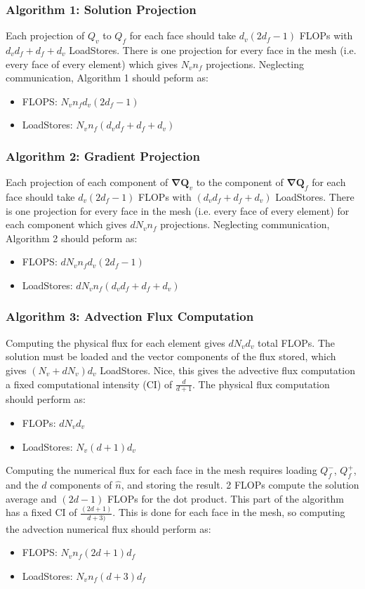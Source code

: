 \documentclass[11pt]{article}
\renewcommand{\vec}[1]{\bm{#1}}
\begin{document}
\subsubsection{Algorithm 1: Solution Projection}
Each projection of $Q_v$ to $Q_f$ for each face should take $d_v(2d_f - 1)$ FLOPs with $d_v d_f + d_f + d_v$ LoadStores.  There is one projection for every face in the mesh (i.e. every face of every element) which gives $N_v n_f$ projections. Neglecting communication, Algorithm 1 should peform as:
\begin{itemize}
\item FLOPS: $N_v n_f d_v(2d_f - 1)$
\item LoadStores: $N_v n_f (d_v d_f + d_f + d_v)$
\end{itemize}
\subsubsection{Algorithm 2: Gradient Projection}
Each projection of each component of $\vec{\nabla{Q}}_v$ to the component of $\vec{\nabla{Q}}_f$ for each face should take $d_v (2d_f - 1)$ FLOPs with $(d_v d_f + d_f + d_v)$ LoadStores.  There is one projection for every face in the mesh (i.e. every face of every element) for each component which gives $d N_v n_f$ projections. Neglecting communication, Algorithm 2 should peform as:
\begin{itemize}
\item FLOPS: $d N_v n_f d_v(2d_f - 1)$
\item LoadStores: $d N_v n_f (d_v d_f + d_f + d_v)$
\end{itemize}
\subsubsection{Algorithm 3: Advection Flux Computation}
Computing the physical flux for each element gives $d N_v d_v$ total FLOPs. The solution must be loaded and the vector components of the flux stored, which gives $(N_v + d N_v)d_v$ LoadStores. Nice, this gives the advective flux computation a fixed computational intensity (CI) of $\frac{d}{d+1}$.  The physical flux computation should perform as:

\begin{itemize}
\item FLOPs: $d N_v d_v$
\item LoadStores: $N_v(d+1)d_v$ 
\end{itemize}

Computing the numerical flux for each face in the mesh requires loading $Q^-_f$, $Q^+_f$, and the $d$ components of $\hat{n}$, and storing the result. 2 FLOPs compute the solution average and $(2d - 1)$ FLOPs for the dot product. This part of the algorithm has a fixed CI of $\frac{(2d+1)}{d+3)}$. This is done for each face in the mesh, so computing the advection numerical flux should perform as:
\begin{itemize}
\item FLOPS: $N_v n_f (2d + 1) d_f$
\item LoadStores: $N_v n_f (d + 3) d_f$
\end{itemize}
\end{document}
